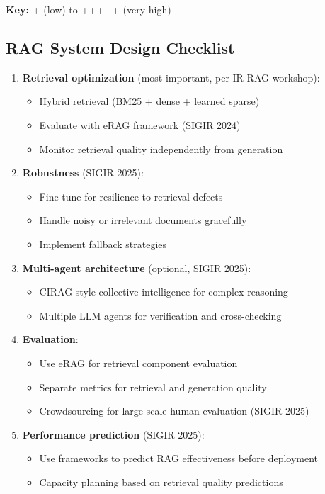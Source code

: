 \documentclass[11pt,letterpaper]{article}
\begin{document}
\textbf{Key:} + (low) to +++++ (very high)

\subsection{RAG System Design Checklist}

\begin{enumerate}[leftmargin=*]
    \item \textbf{Retrieval optimization} (most important, per IR-RAG workshop):
    \begin{itemize}
        \item Hybrid retrieval (BM25 + dense + learned sparse)
        \item Evaluate with eRAG framework (SIGIR 2024)
        \item Monitor retrieval quality independently from generation
    \end{itemize}

    \item \textbf{Robustness} (SIGIR 2025):
    \begin{itemize}
        \item Fine-tune for resilience to retrieval defects
        \item Handle noisy or irrelevant documents gracefully
        \item Implement fallback strategies
    \end{itemize}

    \item \textbf{Multi-agent architecture} (optional, SIGIR 2025):
    \begin{itemize}
        \item CIRAG-style collective intelligence for complex reasoning
        \item Multiple LLM agents for verification and cross-checking
    \end{itemize}

    \item \textbf{Evaluation}:
    \begin{itemize}
        \item Use eRAG for retrieval component evaluation
        \item Separate metrics for retrieval and generation quality
        \item Crowdsourcing for large-scale human evaluation (SIGIR 2025)
    \end{itemize}

    \item \textbf{Performance prediction} (SIGIR 2025):
    \begin{itemize}
        \item Use frameworks to predict RAG effectiveness before deployment
        \item Capacity planning based on retrieval quality predictions
    \end{itemize}
\end{enumerate}
\end{document}

